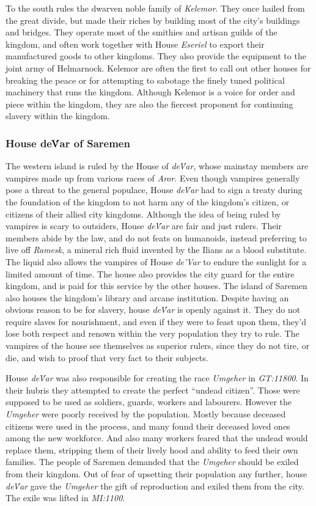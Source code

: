 To the south rules the dwarven noble family of \emph{Kelemor}. They once
hailed from the great divide, but made their riches by building most of
the city's buildings and bridges. They operate most of the smithies and
artisan guilds of the kingdom, and often work together with House
\emph{Eseriel} to export their manufactured goods to other kingdoms.
They also provide the equipment to the joint army of Helmarnock. Kelemor
are often the first to call out other houses for breaking the peace or
for attempting to sabotage the finely tuned political machinery that
runs the kingdom. Although Kelemor is a voice for order and piece within
the kingdom, they are also the fiercest proponent for continuing slavery
within the kingdom.

\subsubsection*{House de\'Var of Saremen}

The western island is ruled by the House of \emph{de\'Var}, whose mainstay
members are vampires made up from various races of \emph{Aror}. Even though
vampires generally pose a threat to the general populace, House \emph{de\'Var}
had to sign a treaty during the foundation of the kingdom to not harm any of
the kingdom's citizen, or citizens of their allied city kingdoms. Although
the idea of being ruled by vampires is scary to outsiders, House \emph{de\'Var}
are fair and just rulers. Their members abide by the law, and do not feats on
humanoids, instead preferring to live off \emph{Ramesk}, a mineral rich fluid
invented by the Ilians as a blood substitute. The liquid also allows the
vampires of House \emph{de'Var} to endure the sunlight for a limited amount of
time. The house also provides the city guard for the entire kingdom, and is
paid for this service by the other houses. The island of Saremen also houses
the kingdom's library and arcane institution. Despite having an obvious reason
to be for slavery, house \emph{de\'Var} is openly against it. They do not
require slaves for nourishment, and even if they were to feast upon them,
they'd lose both respect and renown within the very population they try to
rule. The vampires of the house see themselves as superior rulers, since they
do not tire, or die, and wish to proof that very fact to their subjects.

House \emph{de\'Var} was also responsible for creating the race \emph{Umgeher}
in \emph{GT:11800}. In their hubris they attempted to create the perfect
``undead citizen''. Those were supposed to be used as soldiers, guards,
workers and labourers. However the \emph{Umgeher} were poorly received by the
population. Mostly because deceased citizens were used in the process, and
many found their deceased loved ones among the new workforce. And also many
workers feared that the undead would replace them, stripping them of their
lively hood and ability to feed their own families. The people of Saremen
demanded that the \emph{Umgeher} should be exiled from their kingdom. Out of
fear of upsetting their population any further, house \emph{de\'Var} gave the
\emph{Umgeher} the gift of reproduction and exiled them from the city. The
exile was lifted in \emph{MI:1100}.


